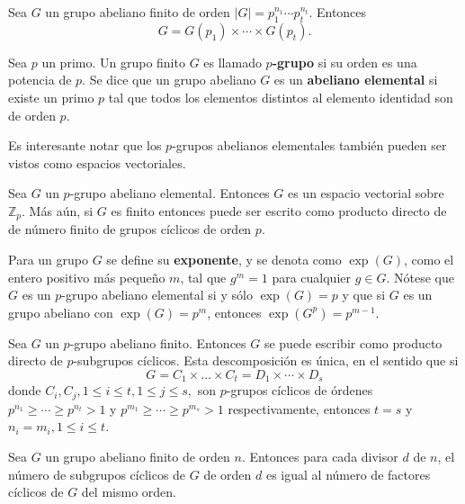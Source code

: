 \begin{lema}
Sea $G$ un grupo abeliano finito de orden $\mid G \mid = p_1^{n_1}\cdots p_t^{n_t}$. Entonces \[ G = G(p_1)\times \cdots \times G(p_t). \]
\end{lema}
\begin{definicion}
Sea $p$ un primo. Un grupo finito $G$ es llamado \textbf{$p$-grupo} si su orden es una potencia de $p$.
Se dice que un grupo abeliano $G$ es un \textbf{abeliano elemental} si existe un primo $p$ tal que todos los elementos distintos al elemento identidad son de orden $p$.
\end{definicion}
Es interesante notar que los $p$-grupos abelianos elementales también pueden ser vistos como espacios vectoriales.
\begin{lema}
Sea $G$ un $p$-grupo abeliano elemental. Entonces $G$ es un espacio vectorial sobre $\mathds{Z}_p$. Más aún, si $G$ es finito entonces puede ser escrito como producto directo de de número finito de grupos cíclicos de orden $p$.
\end{lema}
Para un grupo $G$ se define su \textbf{exponente}, y se denota como $\exp(G)$, como el entero positivo más pequeño $m$, tal que $g^m=1$ para cualquier $g \in G$. Nótese que $G$ es un $p$-grupo abeliano elemental si y sólo $\exp(G)=p$ y que si $G$ es un grupo abeliano con $\exp(G) = p^m$, entonces $\exp(G^p) = p^{m-1}$.
\begin{teorema}\label{teo:estructuraAbelianos}
Sea $G$ un $p$-grupo abeliano finito. Entonces $G$ se puede escribir como producto directo de $p$-subgrupos cíclicos. Esta descomposición es única, en el sentido que si
\[ G = C_1 \times \dots \times C_t = D_1 \times \cdots \times D_s \]
donde $C_i,C_j, 1\leq i \leq t, 1\leq j \leq s,$ son $p$-grupos cíclicos de órdenes $p^{n_1} \geq \cdots \geq p^{n_t}>1$ y $p^{m_1}\geq \cdots \geq p^{m_s}>1$ respectivamente, entonces $t=s$ y $n_i = m_i, 1\leq i \leq t$.
\end{teorema} 
\begin{proposicion}
Sea $G$ un grupo abeliano finito de orden $n$. Entonces para cada divisor $d$ de $n$, el número de subgrupos cíclicos de $G$ de orden $d$ es igual al número de factores cíclicos de $G$ del mismo orden.
\end{proposicion}

